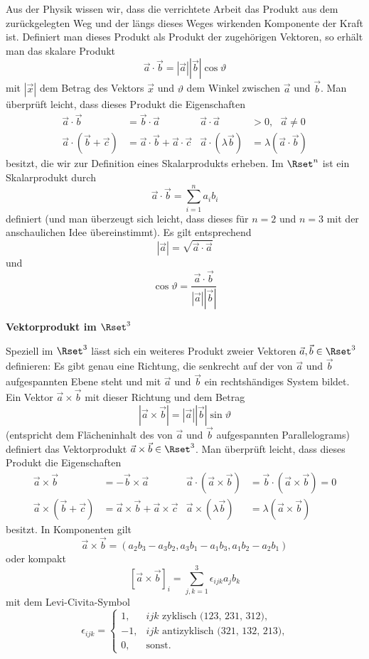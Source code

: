\documentclass[a4paper,10pt]{article}
\begin{document}
Aus der Physik wissen wir, dass die verrichtete Arbeit das Produkt aus
dem zurückgelegten Weg und der längs dieses Weges wirkenden Komponente
der Kraft ist.
Definiert man dieses Produkt als Produkt der zugehörigen Vektoren, so
erhält man das skalare Produkt
\[
\vec{a}\cdot \vec{b}=|\vec{a}||\vec{b}|\cos\vartheta
\]
mit $|\vec{x}|$ dem Betrag des Vektors $\vec{x}$
und $\vartheta$ dem Winkel zwischen $\vec{a}$ und $\vec{b}$.
Man überprüft leicht, dass dieses Produkt die Eigenschaften
\begin{align*}
\vec{a}\cdot \vec{b} &= \vec{b}\cdot \vec{a} &
\vec{a}\cdot \vec{a} &> 0,~~~\vec{a}\not=0 \\
\vec{a}\cdot (\vec{b}+\vec{c}) &= \vec{a}\cdot \vec{b} + \vec{a}\cdot \vec{c} &
\vec{a}\cdot (\lambda \vec{b}) &= \lambda (\vec{a}\cdot \vec{b})
\end{align*}
besitzt, die wir zur Definition eines Skalarprodukts erheben.
Im $\Rset^n$ ist ein Skalarprodukt durch
\[
\vec{a}\cdot \vec{b} = \sum_{i=1}^n a_i b_i
\]
definiert (und man überzeugt sich leicht, dass dieses für $n=2$ und $n=3$
mit der anschaulichen Idee übereinstimmt).
Es gilt entsprechend
\[
|\vec{a}|=\sqrt{\vec{a}\cdot \vec{a}}
\]
und
\[
\cos\vartheta = \frac{\vec{a}\cdot \vec{b}}{|\vec{a}||\vec{b}|}
\]

{\bf Vektorprodukt im $\Rset^3$}

Speziell im $\Rset^3$ lässt sich ein weiteres Produkt zweier Vektoren
$\vec{a},\vec{b}\in \Rset^3$ definieren: Es gibt genau eine Richtung, die
senkrecht auf der von $\vec{a}$ und $\vec{b}$ aufgespannten Ebene steht
und mit $\vec{a}$ und $\vec{b}$ ein rechtshändiges System bildet. Ein
Vektor $\vec{a}\times\vec{b}$ mit dieser Richtung und dem Betrag
\[
|\vec{a}\times\vec{b}|=|\vec{a}||\vec{b}|\sin\vartheta
\]
(entspricht dem Flächeninhalt des von $\vec{a}$ und $\vec{b}$ aufgespannten
Parallelograms) definiert das Vektorprodukt $\vec{a}\times\vec{b}\in\Rset^3$.
Man überprüft leicht, dass dieses Produkt die Eigenschaften
\begin{align*}
\vec{a}\times \vec{b} &= -\vec{b}\times \vec{a} &
\vec{a}\cdot(\vec{a}\times\vec{b})&=\vec{b}\cdot(\vec{a}\times\vec{b})=0\\
\vec{a}\times (\vec{b}+\vec{c}) &= \vec{a}\times \vec{b} + \vec{a}\times \vec{c} &
\vec{a}\times (\lambda \vec{b}) &= \lambda (\vec{a}\times \vec{b})
\end{align*}
besitzt.
In Komponenten gilt
\[
\vec{a}\times \vec{b} = (a_2b_3-a_3b_2,a_3b_1-a_1b_3,a_1b_2-a_2b_1)
\]
oder kompakt
\[
[\vec{a}\times \vec{b}]_i = \sum_{j,k=1}^3 \epsilon_{ijk}a_jb_k
\]
mit dem Levi-Civita-Symbol
\[
\epsilon_{ijk} = \left\{\begin{array}{rl}1,&ijk\textrm{~zyklisch~(123,~231,~312),}\\-1,&ijk\textrm{~antizyklisch~(321,~132,~213),}\\0,&\textrm{sonst.}\end{array}\right.
\]
\end{document}
